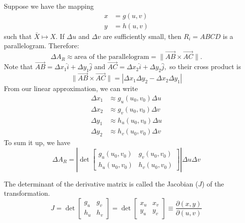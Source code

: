 \begin{itemize}
    Suppose we have the mapping 
    \begin{align}
        x &= g(u,v) \\ 
        y &= h(u,v)
    \end{align}
    such that $\bar{X}\mapsto X$. If $\Delta u$ and $\Delta v$ are sufficiently small, then $R_i=ABCD$ is a parallelogram. Therefore: 
    \begin{equation}
        \Delta A_R \approx \text{area of the parallelogram} = \lVert \vec{AB} \times \vec{AC}\rVert.
    \end{equation} 
    Note that $\vec{AB}=\Delta x_1 \hat{i}+\Delta y_1 \hat{j}$ and $\vec{AC} = \Delta x_2\hat{i}+\Delta y_2 \hat{j},$ so their cross product is 
    \begin{equation}
        \lVert \vec{AB}\times \vec{AC} \rVert = |\Delta x_1\Delta y_2 - \Delta x_2\Delta y_1| 
    \end{equation}
    From our linear approximation, we can write 
    \begin{align}
        \Delta x_1 &\approx g_u(u_0,v_0)\Delta u \\ 
        \Delta x_2 &\approx g_v(u_0,v_0)\Delta v \\ 
        \Delta y_1 &\approx h_u(u_0,v_0)\Delta u \\ 
        \Delta y_2 &\approx h_v(u_0,v_0)\Delta v
    \end{align}
    To sum it up, we have 
    \begin{equation}
        \Delta A_R = \left|\det \begin{bmatrix}
            g_u(u_0,v_0) & g_v(u_0,v_0) \\ 
            h_u(u_0,v_0) & h_v(u_0,v_0)
        \end{bmatrix}\right| \Delta u\Delta v
    \end{equation}
    \begin{definition}
        The determinant of the derivative matrix is called the Jacobian ($J$) of the transformation. 
        \begin{equation}
            J = \det \begin{bmatrix}
                g_u & g_v \\ 
                h_u & h_v
            \end{bmatrix} = \det\begin{bmatrix}
                x_u & x_v \\ 
                y_u & y_v
            \end{bmatrix} \equiv \frac{\partial(x,y)}{\partial(u,v)}

\end{equation}
\end{definition}
\end{itemize}
